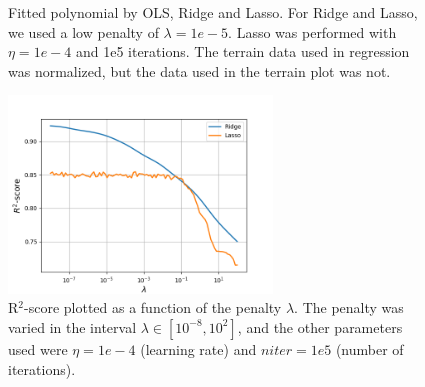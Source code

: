 \begin{figure} [H]
	
	\caption{Fitted polynomial by OLS, Ridge and Lasso. For Ridge and Lasso, we used a low penalty of $\lambda=1e-5$. Lasso was performed with $\eta=1e-4$ and 1e5 iterations. The terrain data used in regression was normalized, but the data used in the terrain plot was not.}%
	\label{fig:terrain_plots}%
\end{figure}
\begin{figure} [H]
	\centering
	\includegraphics[width=7cm]{../plots/lambda_R2score_terrain.png}
	\caption{R$^2$-score plotted as a function of the penalty $\lambda$. The penalty was varied in the interval $\lambda\in[10^{-8},10^2]$, and the other parameters used were $\eta=1e-4$ (learning rate) and $niter=1e5$ (number of iterations).}
	\label{fig:R2_scores_terrain}
\end{figure}
\restoregeometry


